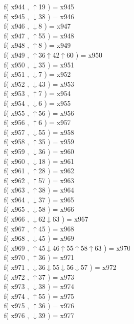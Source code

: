 f( x944 , $\uparrow$19 ) = x945 \\
f( x945 , $\downarrow$38 ) = x946 \\
f( x946 , $\downarrow$8 ) = x947 \\
f( x947 , $\uparrow$55 ) = x948 \\
f( x948 , $\uparrow$8 ) = x949 \\
f( x949 , $\uparrow$36$\uparrow$42$\uparrow$60 ) = x950 \\
f( x950 , $\downarrow$35 ) = x951 \\
f( x951 , $\downarrow$7 ) = x952 \\
f( x952 , $\downarrow$43 ) = x953 \\
f( x953 , $\uparrow$7 ) = x954 \\
f( x954 , $\downarrow$6 ) = x955 \\
f( x955 , $\uparrow$56 ) = x956 \\
f( x956 , $\uparrow$6 ) = x957 \\
f( x957 , $\downarrow$55 ) = x958 \\
f( x958 , $\uparrow$35 ) = x959 \\
f( x959 , $\downarrow$36 ) = x960 \\
f( x960 , $\downarrow$18 ) = x961 \\
f( x961 , $\uparrow$28 ) = x962 \\
f( x962 , $\uparrow$57 ) = x963 \\
f( x963 , $\uparrow$38 ) = x964 \\
f( x964 , $\downarrow$37 ) = x965 \\
f( x965 , $\downarrow$58 ) = x966 \\
f( x966 , $\downarrow$62$\downarrow$63 ) = x967 \\
f( x967 , $\uparrow$45 ) = x968 \\
f( x968 , $\downarrow$45 ) = x969 \\
f( x969 , $\uparrow$45$\downarrow$46$\uparrow$55$\uparrow$58$\uparrow$63 ) = x970 \\
f( x970 , $\uparrow$36 ) = x971 \\
f( x971 , $\downarrow$36$\downarrow$55$\downarrow$56$\downarrow$57 ) = x972 \\
f( x972 , $\uparrow$37 ) = x973 \\
f( x973 , $\downarrow$38 ) = x974 \\
f( x974 , $\uparrow$55 ) = x975 \\
f( x975 , $\uparrow$36 ) = x976 \\
f( x976 , $\downarrow$39 ) = x977 \\
